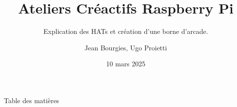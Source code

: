 \documentclass[aspectratio=169,xcolor=dvipsnames]{beamer}
\title{Ateliers Créactifs Raspberry Pi}
\subtitle{Explication des HATs et création d'une borne d'arcade.}
\author{Jean Bourgies, Ugo Proietti}
\date{10 mars 2025}
\begin{document}
\begin{frame}
    \titlepage
\end{frame}

\begin{frame}{Table des matières}
    \tableofcontents
\end{frame}
\end{document}
